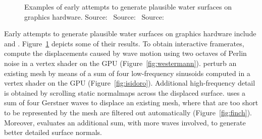 \begin{figure}
{	\label{fig:isidoro}
 }
 \hfill
 \caption[Examples of early attempts to generate plausible water surfaces on graphics hardware.]{
  Examples of early attempts to generate plausible water surfaces on graphics hardware.
   Source:~\citet{Schneider:2001}
   Source:~\citet{Isidoro:2002}
   Source:~\citet{Finch:2004}
}
\label{fig:earlygpu}
\end{figure}
%
Early attempts to generate plausible water surfaces on graphics hardware include
\citet{Schneider:2001, Isidoro:2002} and \citet{Finch:2004}. Figure~\ref{fig:earlygpu}
depicts some of their results.
To obtain interactive framerates, \citeauthor{Schneider:2001} compute the
displacements caused by wave motion using two octaves of Perlin noise in a
vertex shader on the GPU (Figure~\ref{fig:westermann}).
\citeauthor{Isidoro:2002} perturb an existing mesh by means of a sum of four
low-frequency sinusoids computed in a vertex shader on the GPU
(Figure~\ref{fig:isidoro}). Additional high-frequency detail is obtained by
scrolling static normalmaps across the displaced surface.
\citeauthor{Finch:2004} uses a sum of four Gerstner waves to displace an existing
mesh, where \wavelengths that are too short to be represented by the mesh are
filtered out automatically (Figure~\ref{fig:finch}). Moreover,
\citeauthor{Finch:2004} evaluates an additional sum, with more waves involved,
to generate better detailed surface normals.

